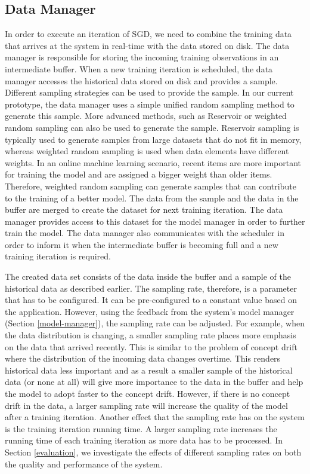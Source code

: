 \documentclass{vldb}
\begin{document}
\subsection{Data Manager} \label{data-manager}
In order to execute an iteration of SGD, we need to combine the training data that arrives at the system in real-time with the data stored on disk.
The data manager is responsible for storing the incoming training observations in an intermediate buffer.
When a new training iteration is scheduled, the data manager accesses the historical data stored on disk and provides a sample.
Different sampling strategies can be used to provide the sample.
In our current prototype, the data manager uses a simple unified random sampling method to generate this sample.
More advanced methods, such as Reservoir \cite{vitter1985random} or weighted random sampling can also be used to generate the sample.
Reservoir sampling is typically used to generate samples from large datasets that do not fit in memory, whereas weighted random sampling is used when data elements have different weights.
In an online machine learning scenario, recent items are more important for training the model and are assigned a bigger weight than older items.
Therefore, weighted random sampling can generate samples that can contribute to the training of a better model.
The data from the sample and the data in the buffer are merged to create the dataset for next training iteration.
The data manager provides access to this dataset for the model manager in order to further train the model.
The data manager also communicates with the scheduler in order to inform it when the intermediate buffer is becoming full and a new training iteration is required. 

The created data set consists of the data inside the buffer and a sample of the historical data as described earlier.
The sampling rate, therefore, is a parameter that has to be configured.
It can be pre-configured to a constant value based on the application.
However, using the feedback from the system's model manager (Section \ref{model-manager}), the sampling rate can be adjusted.
For example, when the data distribution is changing, a smaller sampling rate places more emphasis on the data that arrived recently. 
This is similar to the problem of concept drift where the distribution of the incoming data changes overtime.
This renders historical data less important and as a result a smaller sample of the historical data (or none at all) will give more importance to the data in the buffer and help the model to adopt faster to the concept drift.
However, if there is no concept drift in the data, a larger sampling rate will increase the quality of the model after a training iteration.
Another effect that the sampling rate has on the system is the training iteration running time.
A larger sampling rate increases the running time of each training iteration as more data has to be processed.
In Section \ref{evaluation}, we investigate the effects of different sampling rates on both the quality and performance of the system.
\end{document}

